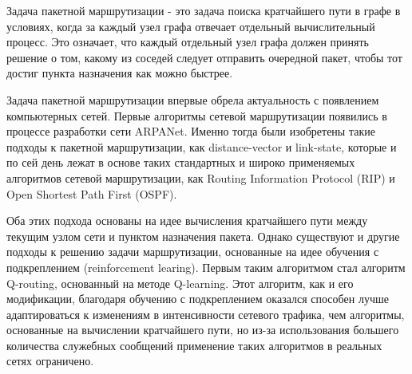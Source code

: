 \documentclass[]{itmo-student-thesis}
\begin{document}
\graphicspath{{img/}}


\tableofcontents

\startprefacepage

Задача пакетной маршрутизации - это задача поиска кратчайшего пути в графе в условиях,
когда за каждый узел графа отвечает отдельный вычислительный процесс. Это
означает, что каждый отдельный узел графа должен принять решение о том, какому
из соседей следует отправить очередной пакет, чтобы тот достиг пункта назначения
как можно быстрее.

Задача пакетной маршрутизации впервые обрела актуальность с появлением
компьютерных сетей. Первые алгоритмы сетевой маршрутизации появились в процессе
разработки сети ARPANet. Именно тогда были изобретены такие подходы к пакетной
маршрутизации, как distance-vector\cite{arpanet-orig} и
link-state\cite{link-state-arpanet}, которые и по сей день лежат в основе таких
стандартных и широко применяемых алгоритмов сетевой маршрутизации, как Routing
Information Protocol (RIP)\cite{rip-rfc} и Open Shortest Path First (OSPF)\cite{ospf-rfc}.

Оба этих подхода основаны на идее вычисления кратчайшего пути между текущим
узлом сети и пунктом назначения пакета. Однако существуют и другие подходы к
решению задачи маршрутизации, основанные на идее обучения с подкреплением
(reinforcement learing). Первым таким алгоритмом стал алгоритм
Q-routing\cite{q-routing-orig}, основанный на методе
Q-learning\cite{q-learning-orig}. Этот алгоритм, как и его
модификации\cite{predictive-q-routing, dual-q-routing},
благодаря обучению с подкреплением оказался способен лучше адаптироваться к
изменениям в интенсивности сетевого трафика, чем алгоритмы, основанные на
вычислении кратчайшего пути, но из-за использования большего количества
служебных сообщений применение таких алгоритмов в реальных сетях ограничено.
\end{document}
